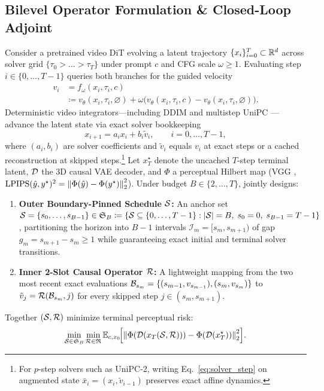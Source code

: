 \subsection{Bilevel Operator Formulation \& Closed-Loop Adjoint}
\label{sec:bilevel_obj}
Consider a pretrained video DiT evolving a latent trajectory $\{x_i\}_{i=0}^T \subset \mathbb{R}^d$ across solver grid $\{\tau_0 > \dots > \tau_T\}$ under prompt $c$ and CFG scale $\omega \ge 1$. Evaluating step $i \in \{0,\dots,T-1\}$ queries both branches for the guided velocity
\begin{equation}
\begin{aligned}
v_i &= f_\omega(x_i, \tau_i, c) \\
&\coloneqq v_\theta(x_i, \tau_i, \varnothing) + \omega \bigl(v_\theta(x_i, \tau_i, c) - v_\theta(x_i, \tau_i, \varnothing)\bigr).
\end{aligned}
\label{eq:cfg_velocity}
\end{equation}
Deterministic video integrators---including DDIM \citep{song2021ddim} and multistep UniPC \citep{zhao2023unipc}---advance the latent state via exact solver bookkeeping
\begin{equation}
x_{i+1} = a_i x_i + b_i \tilde{v}_i, \qquad i = 0, \dots, T - 1,
\label{eq:solver_step}
\end{equation}
where $(a_i, b_i)$ are solver coefficients and $\tilde{v}_i$ equals $v_i$ at exact steps or a cached reconstruction at skipped steps.\footnote{For $p$-step solvers such as UniPC-2, writing Eq.~\eqref{eq:solver_step} on augmented state $\bar{x}_i = (x_i, \tilde{v}_{i-1})$ preserves exact affine dynamics.} Let $x_T^\star$ denote the uncached $T$-step terminal latent, $\mathcal{D}$ the 3D causal VAE decoder, and $\Phi$ a perceptual Hilbert map (VGG \citep{zhang2018lpips}, $\mathrm{LPIPS}(\hat{y}, y^\star)^2 = \left\lVert \Phi(\hat{y}) - \Phi(y^\star) \right\rVert_2^2$). Under budget $B \in \{2,\dots,T\}$, \method{} jointly designs:
\begin{enumerate}
\item \textbf{Outer Boundary-Pinned Schedule $\mathcal{S}$:} An anchor set $\mathcal{S} = \{s_0, \dots, s_{B-1}\} \in \mathfrak{S}_B \coloneqq \{\mathcal{S} \subseteq \{0,\dots,T-1\} : |\mathcal{S}| = B,\; s_0 = 0,\; s_{B-1} = T-1\}$, partitioning the horizon into $B-1$ intervals $\mathcal{I}_m = [s_m, s_{m+1})$ of gap $g_m = s_{m+1} - s_m \ge 1$ while guaranteeing exact initial and terminal solver transitions.
\item \textbf{Inner 2-Slot Causal Operator $\mathcal{R}$:} A lightweight mapping from the two most recent exact evaluations $\mathcal{B}_{s_m} = \{(s_{m-1}, v_{s_{m-1}}), (s_m, v_{s_m})\}$ to $\tilde{v}_j = \mathcal{R}(\mathcal{B}_{s_m}, j)$ for every skipped step $j \in (s_m, s_{m+1})$.
\end{enumerate}
Together $(\mathcal{S}, \mathcal{R})$ minimize terminal perceptual risk:
\begin{equation}
\min_{\mathcal{S} \in \mathfrak{S}_B} \min_{\mathcal{R} \in \mathfrak{R}} \mathbb{E}_{c, x_0}\!\Bigl[\left\lVert \Phi(\mathcal{D}(x_T(\mathcal{S}, \mathcal{R}))) - \Phi(\mathcal{D}(x_T^\star)) \right\rVert_2^2\Bigr].
\label{eq:bilevel}
\end{equation}

